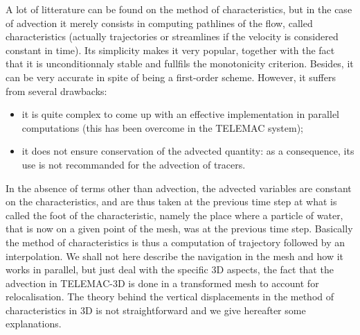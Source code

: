A lot of litterature can be found on the method of characteristics, but in the
case of advection it merely consists in computing pathlines of the flow,
called characteristics (actually trajectories or streamlines if the velocity
is considered constant in time). Its simplicity makes it very popular, together with the
fact that it is unconditionnaly stable and fullfils the monotonicity criterion. Besides,
it can be very accurate in spite of being a first-order scheme. However, it suffers
from several drawbacks:
\begin{itemize}
\item it is quite complex to come up with an effective implementation in parallel computations (this
has been overcome in the TELEMAC system);
\item it does not ensure conservation of the advected quantity:
as a consequence, its use is not recommanded for the advection of tracers.\\
\end{itemize}
In the absence of terms other than advection,
the advected variables are constant on the characteristics, and are thus taken
at the previous time step at what is called the foot of the characteristic,
namely the place where a particle of water, that is now on a given point
of the mesh, was at the previous time step. Basically the method of
characteristics is thus a computation of trajectory followed by an
interpolation. 
We shall not here describe the navigation in the mesh and how
it works in parallel, but just deal with the specific 3D aspects, the fact
that the advection in TELEMAC-3D is done in a transformed mesh to account for
relocalisation. The theory behind the vertical displacements in the method of
characteristics in 3D is not straightforward and we give hereafter
some explanations.\\

